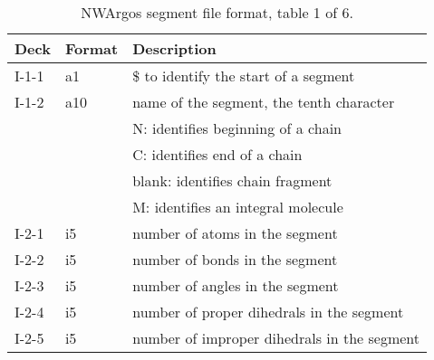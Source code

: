 \begin{table}[htbp]
\center

\label{tbl:nwaseg1}

\begin{tabular*}{150mm}{p{12mm}p{12mm}l}
\hline\hline
Deck  & Format & Description \\ \hline
I-1-1 & a1     & \$ to identify the start of a segment \\ %
I-1-2 & a10    & name of the segment, the tenth character\\
      &        & N: identifies beginning of a chain\\
      &        & C: identifies end of a chain\\
      &        & blank: identifies chain fragment\\
      &        & M: identifies an integral molecule\\
I-2-1 & i5     & number of atoms in the segment\\
I-2-2 & i5     & number of bonds in the segment\\
I-2-3 & i5     & number of angles in the segment\\
I-2-4 & i5     & number of proper dihedrals in the segment\\
I-2-5 & i5     & number of improper dihedrals in the segment\\
\hline
\end{tabular*}

\caption{NWArgos segment file format, table 1 of 6.}
\end{table}

